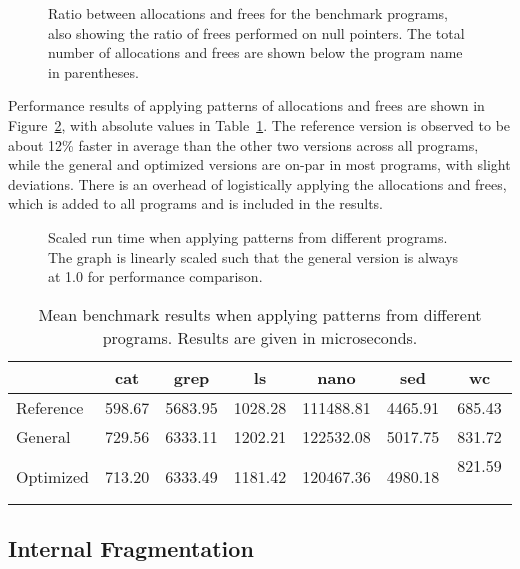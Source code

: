 \begin{figure}[h]
    \centering
    
    \caption{Ratio between allocations and frees for the benchmark programs, also showing the ratio of frees performed on null pointers. The total number of allocations and frees are shown below the program name in parentheses.}
    \label{fig:program_ratios}
\end{figure}

Performance results of applying patterns of allocations and frees are shown in Figure~\ref{fig:program_benchmarks}, with absolute values in Table~\ref{table:program_benchmarks}. The reference version is observed to be about 12\% faster in average than the other two versions across all programs, while the general and optimized versions are on-par in most programs, with slight deviations. There is an overhead of logistically applying the allocations and frees, which is added to all programs and is included in the results.

\begin{figure}[]
    \centering
    
    \caption{Scaled run time when applying patterns from different programs. The graph is linearly scaled such that the general version is always at 1.0 for performance comparison.}
    \label{fig:program_benchmarks}
\end{figure}

\begin{table}[]
    \centering
    \begin{tabular}{p{3.44cm}|cccccc}
    {} & {cat} & {grep} & {ls} & {nano} & {sed} & {wc} \\
    \hline
    Reference & 598.67 & 5683.95 & 1028.28 & 111488.81 & 4465.91 & 685.43 \\
    General   & 729.56 & 6333.11 & 1202.21 & 122532.08 & 5017.75 & 831.72 \\
    Optimized & 713.20 & 6333.49 & 1181.42 & 120467.36 & 4980.18 & 821.59 \
    \end{tabular}
    \caption{Mean benchmark results when applying patterns from different programs. Results are given in microseconds.}
    \label{table:program_benchmarks}
\end{table}

\newpage

\subsection{Internal Fragmentation}

